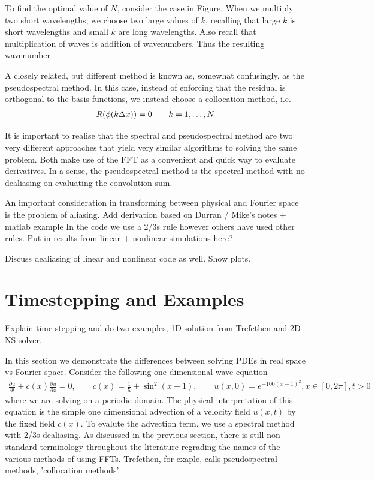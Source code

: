 To find the optimal value of $N$, consider the case in Figure. When we multiply two short wavelengths, we choose two large values of $k$, recalling that large $k$ is short wavelengths and small $k$ are long wavelengths. Also recall that multiplication of waves is addition of wavenumbers. Thus the resulting wavenumber 

A closely related, but different method is known as, somewhat confusingly, as the pseudospectral method.  In this case, instead of enforcing that the residual is orthogonal to the basis functions, we instead choose a collocation method, i.e.
\begin{align}
R(\phi(k\Delta x)) = 0 \qquad k=1,\ldots,N
\end{align}

It is important to realise that the spectral and pseudospectral method are two very different approaches that yield very similar algorithms to solving the same problem. Both make use of the FFT as a convenient and quick way to evaluate derivatives. In a sense, the pseudospectral method is the spectral method with no dealiasing on evaluating the convolution sum. 

An important consideration in transforming between physical and Fourier space is the problem of aliasing.  Add derivation based on Durran / Mike's notes + matlab example In the code we use a 2/3s rule however others have used other rules. Put in results from linear + nonlinear simulations here?

Discuss dealiasing of linear and nonlinear code as well. Show plots. 
\section{Timestepping and Examples}
Explain time-stepping and do two examples, 1D solution from Trefethen and 2D NS solver.  

In this section we demonstrate the differences between solving PDEs in real space vs Fourier space. Consider the following one dimensional wave equation\cite{trefethen_spectral}
\begin{align}
\frac{\partial u}{\partial t} + c(x)\frac{\partial u}{\partial x} = 0,\qquad c(x)=\frac{1}{5}+\sin^{2}(x-1), \qquad u(x,0)=e^{-100(x-1)^{2}}, x\in[0,2\pi], t>0
\end{align}
where we are solving on a periodic domain. The physical interpretation of this equation is the simple one dimensional advection of a velocity field $u(x,t)$ by the fixed field $c(x)$. To evalute the advection term, we use a spectral method with 2/3s dealiasing. As discussed in the previous section, there is still non-standard terminology throughout the literature regrading the names of the various methods of using FFTs. Trefethen, for exaple, calls pseudospectral methods, 'collocation methods'. 

